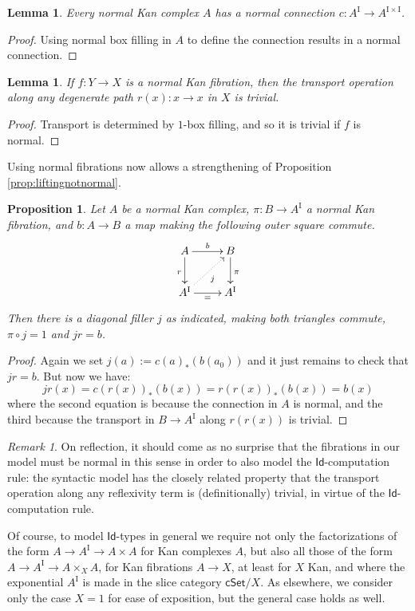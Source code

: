 \documentclass[12pt]{article}
\newcommand{\cSet}{\ensuremath{\mathsf{cSet}}}
\newcommand{\I}{\ensuremath{\mathrm{I}}}
\newcommand{\pA}{\ensuremath{A^\I}}
\newcommand{\Id}{\ensuremath{\mathsf{Id}}}
\newtheorem{proposition}[theorem]{Proposition}
\newtheorem{lemma}[theorem]{Lemma}
\theoremstyle{remark}
\newtheorem{remark}[theorem]{Remark}
\theoremstyle{definition}
\begin{document}
\begin{lemma}
Every normal Kan complex  $A$ has a normal connection $c : A^\I \to A^{\I\times\I}$.
\end{lemma}
\begin{proof}
Using normal box filling in $A$ to define the connection results in a normal connection.
\end{proof}

\begin{lemma}
If $f: Y\to X$ is a normal Kan fibration, then the transport operation along any degenerate path $r(x) : x\to x$ in $X$ is trivial.
\end{lemma}
\begin{proof}
Transport is determined by $1$-box filling, and so it is trivial if $f$ is normal.
\end{proof}

Using normal fibrations now allows a strengthening of Proposition \ref{prop:liftingnotnormal}.

\begin{proposition}\label{prop:liftingnormal}
Let $A$ be a normal Kan complex, $\pi : B \to A^\I$ a normal Kan fibration, and $b : A\to B$ a map making the following outer square commute.
\begin{equation}\label{diagram:IdElim2}
\xymatrix{
A \ar[d]_{r} \ar[r]^{b} & \ar[d]^{\pi} B \\
A^\I \ar@{..>}[ru]_{j} \ar[r]_{=} & A^\I
}
\end{equation}
Then there is a diagonal filler $j$ as indicated, making both triangles commute, $\pi\circ j = 1$ and $jr=b$.
\end{proposition}
\begin{proof}
Again we set $j(a) := c(a)_*(b(a_0))$ and it just remains to check that $jr=b$.  But now we have:
\[
jr(x) = c(r(x))_*(b(x)) = r(r(x))_*(b(x)) = b(x)
\]
where the second equation is because the connection in $A$ is normal, and the third because the transport in $B\to\pA$ along $r(r(x))$ is trivial.
\end{proof}

\begin{remark}
On reflection, it should come as no surprise that the fibrations in our model must be normal in this sense in order to also model the \Id-computation rule: the syntactic model has the closely related property that the transport operation along any reflexivity term is (definitionally) trivial, in virtue of the \Id-computation rule.

Of course, to model \Id-types in general we require not only the factorizations of the form $A \to A^\I \to A\times A$ for Kan complexes $A$, but also all those of the form $A \to A^\I \to A\times_X A$, for Kan fibrations $A\to X$, at least for $X$ Kan, and where the exponential $A^\I$ is made in the slice category $\cSet/X$.  As elsewhere, we consider only the case $X=1$ for ease of exposition, but the general case holds as well.
\end{remark}
\end{document}
